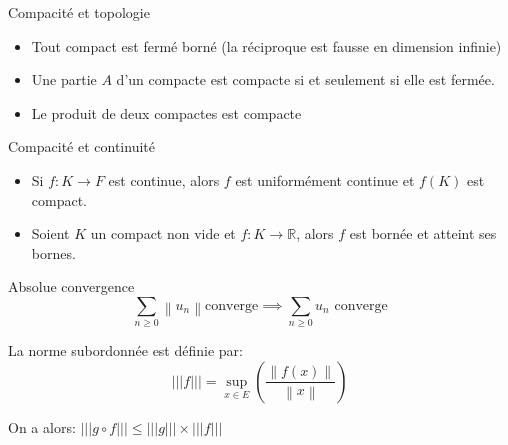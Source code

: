 \documentclass[french, a4paper, 11pt, twocolumn]{article}
\newcommand{\ssi}{si et seulement si\xspace}		%
\newcommand{\norme}[1]{\left\| #1\right\|}
\newcommand{\R}{\mathbb{R}}   %
\newcommand{\po}{\left(}         %
\newcommand{\pf}{\right)}        %
\newcommand{\pof}[1]{\po #1 \pf} %
\begin{document}
\begin{theoreme}{Compacité et topologie}
    \begin{itemize}[label=$\bullet$]
        \item Tout compact est fermé borné (la réciproque est fausse en dimension infinie)
        \item Une partie $A$ d'un compacte est compacte \ssi elle est fermée.
        \item Le produit de deux compactes est compacte
    \end{itemize}
\end{theoreme}

\begin{theoreme}{Compacité et continuité}
    \begin{itemize}[label=$\bullet$]
        \item Si $f : K \rightarrow F$ est continue, alors $f$ est uniformément continue et $f(K)$ est compact.
        \item Soient $K$ un compact non vide et $f : K \rightarrow \R$, alors $f$ est bornée et atteint ses bornes.
    \end{itemize}
    
\end{theoreme}

\begin{theoreme}{Absolue convergence}
    \[\sum_{n \geq 0} \norme{u_n} \text{converge} \implies \sum_{n \geq 0} u_n \text{ converge}\]
\end{theoreme}

\begin{definition}
    La norme subordonnée est définie par:
    \[|||f|||=\underset{x \in E}{\sup}\pof{\dfrac{\norme{f(x)}}{\norme{x}}}\]

    On a alors: $|||g \circ f||| \leq |||g||| \times |||f|||$
\end{definition}
\end{document}

